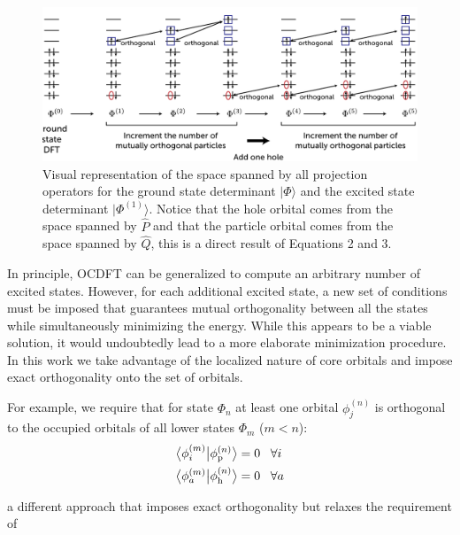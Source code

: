 \documentclass[12pt]{article}
\newcommand{\braket}[3][0]
{\ifthenelse{\equal{#1}{0}}{\left\langle #2 \middle| #3 \right\rangle}
{\ifthenelse{\equal{#1}{1}}{\big\langle #2 \big| #3 \big\rangle}
{\ifthenelse{\equal{#1}{2}}{\Big\langle #2 \Big| #3 \Big\rangle}
{\ifthenelse{\equal{#1}{3}}{\bigg\langle #2 \bigg| #3 \bigg\rangle}
{\ifthenelse{\equal{#1}{4}}{\Bigg\langle #2 \Bigg| #3 \Bigg\rangle}
{Error}}}}}
}
\begin{document}
\begin{figure}
\includegraphics[width=16cm]{Figure2.pdf}
\caption{Visual representation of the space spanned by all projection operators for the ground state determinant $|\Phi\rangle$ and the excited state determinant $|\Phi^{(1)}\rangle$. Notice that the hole orbital comes from the space spanned by $\hat{P}$ and that the particle orbital comes from the space spanned by  $\hat{Q}$, this is a direct result of Equations 2 and 3.}
\label{fig:projection}
\end{figure}

In principle, OCDFT can be generalized to compute an arbitrary number of excited states.  However, for each additional excited state, a new set of conditions must be imposed that guarantees mutual orthogonality  between all the states while simultaneously minimizing the energy.
While this appears to be a viable solution, it would undoubtedly lead to a more elaborate minimization procedure.
In this work we take advantage of the localized nature of core orbitals and impose exact orthogonality onto the set of orbitals.


  For example, we require that for state $\Phi_n$ at least one orbital ${\phi^{(n)}_j}$ is orthogonal to the occupied orbitals of all lower states $\Phi_m$ ($m < n$):
\begin{align}
\braket[1]{\phi^{(m)}_i}{\phi^{(n)}_{\rm p}} &= 0 \;\;\; \forall i \\
\braket[1]{\phi^{(m)}_a}{\phi^{(n)}_{\rm h}} &= 0 \;\;\; \forall a
\end{align}

a different approach that imposes exact orthogonality but relaxes the requirement of 
\end{document}
